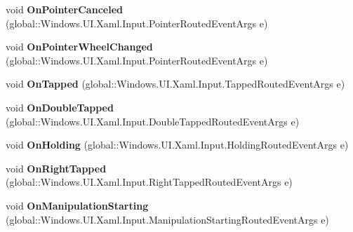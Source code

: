 \begin{DoxyCompactItemize}
void {\bfseries On\+Pointer\+Canceled} (global\+::\+Windows.\+U\+I.\+Xaml.\+Input.\+Pointer\+Routed\+Event\+Args e)
\item 
\mbox{\label{interface_windows_1_1_u_i_1_1_xaml_1_1_controls_1_1_i_control_overrides_a718444e3da7d52bbefe627be97c6acb1}} 
void {\bfseries On\+Pointer\+Wheel\+Changed} (global\+::\+Windows.\+U\+I.\+Xaml.\+Input.\+Pointer\+Routed\+Event\+Args e)
\item 
\mbox{\label{interface_windows_1_1_u_i_1_1_xaml_1_1_controls_1_1_i_control_overrides_a03ba05ffb887e2d5b8a4e46f27ed4817}} 
void {\bfseries On\+Tapped} (global\+::\+Windows.\+U\+I.\+Xaml.\+Input.\+Tapped\+Routed\+Event\+Args e)
\item 
\mbox{\label{interface_windows_1_1_u_i_1_1_xaml_1_1_controls_1_1_i_control_overrides_a5a5f4e8f42a2fe161802c62c49b6876c}} 
void {\bfseries On\+Double\+Tapped} (global\+::\+Windows.\+U\+I.\+Xaml.\+Input.\+Double\+Tapped\+Routed\+Event\+Args e)
\item 
\mbox{\label{interface_windows_1_1_u_i_1_1_xaml_1_1_controls_1_1_i_control_overrides_a92652b416b1ff3a471b4cf7226c1f60f}} 
void {\bfseries On\+Holding} (global\+::\+Windows.\+U\+I.\+Xaml.\+Input.\+Holding\+Routed\+Event\+Args e)
\item 
\mbox{\label{interface_windows_1_1_u_i_1_1_xaml_1_1_controls_1_1_i_control_overrides_a5fbc80a16d3e6c89a86a5b99d3cca69f}} 
void {\bfseries On\+Right\+Tapped} (global\+::\+Windows.\+U\+I.\+Xaml.\+Input.\+Right\+Tapped\+Routed\+Event\+Args e)
\item 
\mbox{\label{interface_windows_1_1_u_i_1_1_xaml_1_1_controls_1_1_i_control_overrides_aa77c2f27ff19f19ddb9d11c56eb88ecf}} 
void {\bfseries On\+Manipulation\+Starting} (global\+::\+Windows.\+U\+I.\+Xaml.\+Input.\+Manipulation\+Starting\+Routed\+Event\+Args e)
\item 
\mbox{\label{interface_windows_1_1_u_i_1_1_xaml_1_1_controls_1_1_i_control_overrides_a21b1d1b2b1ecdec91300370cf68756eb}} 

\end{DoxyCompactItemize}

